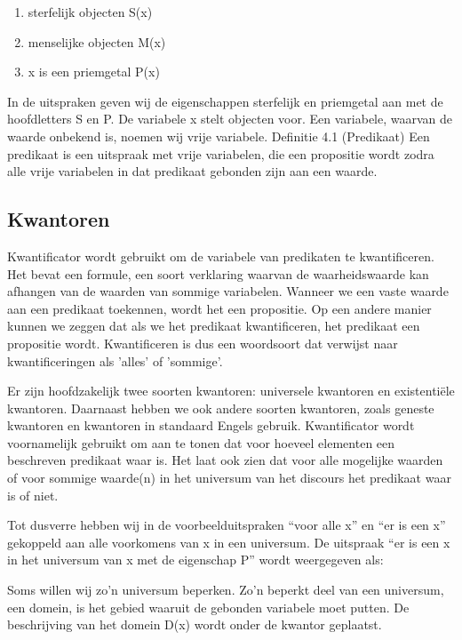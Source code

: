 \documentclass{article}
\begin{document}
	\begin{enumerate}
		\item sterfelijk objecten S(x)
		\item menselijke objecten M(x)
		\item x is een priemgetal P(x)
	\end{enumerate}
	
	
	
	In de uitspraken geven wij de eigenschappen sterfelijk en priemgetal aan met de hoofdletters
	S en P. De variabele x stelt objecten voor. Een variabele, waarvan de waarde onbekend
	is, noemen wij vrije variabele.
	Definitie 4.1 (Predikaat) Een predikaat is een uitspraak met vrije variabelen, die een
	propositie wordt zodra alle vrije variabelen in dat predikaat gebonden zijn aan een waarde.
	
	\subsection{Kwantoren}
	
	Kwantificator wordt gebruikt om de variabele van predikaten te kwantificeren. Het bevat een formule, een soort verklaring waarvan de waarheidswaarde kan afhangen van de waarden van sommige variabelen. Wanneer we een vaste waarde aan een predikaat toekennen, wordt het een propositie. Op een andere manier kunnen we zeggen dat als we het predikaat kwantificeren, het predikaat een propositie wordt. Kwantificeren is dus een woordsoort dat verwijst naar kwantificeringen als 'alles' of 'sommige'.
	
	Er zijn hoofdzakelijk twee soorten kwantoren: universele kwantoren en existentiële kwantoren. Daarnaast hebben we ook andere soorten kwantoren, zoals geneste kwantoren en kwantoren in standaard Engels gebruik. Kwantificator wordt voornamelijk gebruikt om aan te tonen dat voor hoeveel elementen een beschreven predikaat waar is. Het laat ook zien dat voor alle mogelijke waarden of voor sommige waarde(n) in het universum van het discours het predikaat waar is of niet.
	

Tot dusverre hebben wij in de voorbeelduitspraken “voor alle x” en “er is een x” gekoppeld
aan alle voorkomens van x in een universum. De uitspraak “er is een x in het
universum van x met de eigenschap P” wordt weergegeven als:


Soms willen wij zo’n universum beperken. Zo’n beperkt deel van een universum, een
domein, is het gebied waaruit de gebonden variabele moet putten. De beschrijving van
het domein D(x) wordt onder de kwantor geplaatst.
\end{document}
